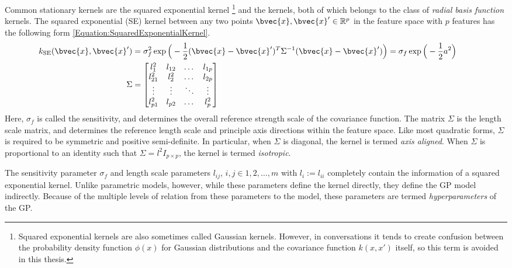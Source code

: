 			Common stationary kernels are the squared exponential kernel \footnote{Squared exponential kernels are also sometimes called Gaussian kernels. However, in conversations it tends to create confusion between the probability density function $\phi(x)$ for Gaussian distributions and the covariance function $k(x, x')$ itself, so this term is avoided in this thesis.} and the \matern kernels, both of which belongs to the class of \textit{radial basis function} kernels. The squared exponential (SE) kernel between any two points $\bvec{x}, \bvec{x}' \in \mathbb{R}^{p}$ in the feature space with $p$ features has the following form \eqref{Equation:SquaredExponentialKernel}. \begin{equation}
				\left.
					\begin{aligned}
						k_{\mathrm{SE}}(\bvec{x}, \bvec{x}') &= \sigma_{f}^{2} \exp\Big(-\frac{1}{2}(\bvec{x} - \bvec{x}')^{T} \Sigma^{-1} (\bvec{x} - \bvec{x}')\Big) = \sigma_{f} \exp\Big(-\frac{1}{2} a^{2} \Big) \\
						\Sigma &= 	\begin{bmatrix}
										l_{1}^{2} & l_{12} & \dots & l_{1p} \\
										l_{21}^{2} & l_{2}^{2} & \dots & l_{2p} \\
										\vdots & \vdots  & \ddots & \vdots \\
										l_{p1}^{2} & l_{p2} & \dots & l_{p}^{2} \\
								  	\end{bmatrix}
					\end{aligned}
				\qquad \right.
			\label{Equation:SquaredExponentialKernel}
			\end{equation} Here, $\sigma_{f}$ is called the sensitivity, and determines the overall reference strength scale of the covariance function. The matrix $\Sigma$ is the length scale matrix, and determines the reference length scale and principle axis directions within the feature space. Like most quadratic forms, $\Sigma$ is required to be symmetric and positive semi-definite. In particular, when $\Sigma$ is diagonal, the kernel is termed \textit{axis aligned}. When $\Sigma$ is proportional to an identity such that $\Sigma = l^{2} I_{p \times p}$, the kernel is termed \textit{isotropic}.
			
			The sensitivity parameter $\sigma_{f}$ and length scale parameters $l_{ij}$, $i, j \in {1, 2, \dots, m}$ with $l_{i} := l_{ii}$ completely contain the information of a squared exponential kernel. Unlike parametric models, however, while these parameters define the kernel directly, they define the GP model indirectly. Because of the multiple levels of relation from these parameters to the model, these parameters are termed \textit{hyperparameters} of the GP.
			
